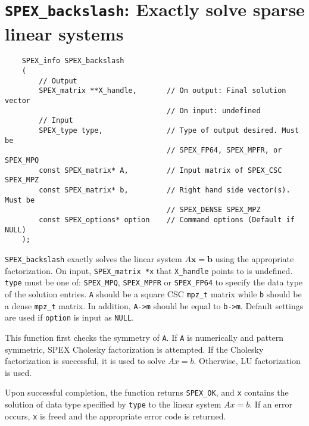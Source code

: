 \documentclass[12pt]{report}
\theoremstyle{definition}
\begin{document}
\section{\texttt{SPEX\_backslash}: Exactly solve sparse linear systems}

\begin{mdframed}[userdefinedwidth=6in]
{\footnotesize
\begin{verbatim}
    SPEX_info SPEX_backslash
    (
        // Output
        SPEX_matrix **X_handle,       // On output: Final solution vector
                                      // On input: undefined
        // Input
        SPEX_type type,               // Type of output desired. Must be
                                      // SPEX_FP64, SPEX_MPFR, or SPEX_MPQ
        const SPEX_matrix* A,         // Input matrix of SPEX_CSC SPEX_MPZ
        const SPEX_matrix* b,         // Right hand side vector(s). Must be
                                      // SPEX_DENSE SPEX_MPZ 
        const SPEX_options* option    // Command options (Default if NULL)
    );
\end{verbatim}
} \end{mdframed}

\verb|SPEX_backslash| exactly solves the linear system $A \mathbf{x} = \mathbf{b}$ using the appropriate factorization. On input, \verb|SPEX_matrix *x| that \verb|X_handle| points to is undefined. \verb|type| must be one of:
\verb|SPEX_MPQ|, \verb|SPEX_MPFR| or \verb|SPEX_FP64| to specify the data type
of the solution entries. \verb|A| should be a square CSC \verb|mpz_t| matrix
while \verb|b| should be a dense \verb|mpz_t| matrix. In addition, \verb|A->m|
should be equal to \verb|b->m|.  Default settings are used if
\verb|option| is input as \verb|NULL|.


This function first checks the symmetry of \verb|A|. If \verb|A| is numerically and pattern symmetric, SPEX Cholesky factorization is attempted. If the Cholesky factorization is successful, it is used to solve $A x = b$. Otherwise, LU factorization is used. 

Upon successful completion, the function returns \verb|SPEX_OK|, and
\verb|x| contains the solution of data type specified by
\verb|type| to the linear system $Ax=b$. If an error occurs, \verb|x| is freed and the appropriate error code is returned.
\end{document}
